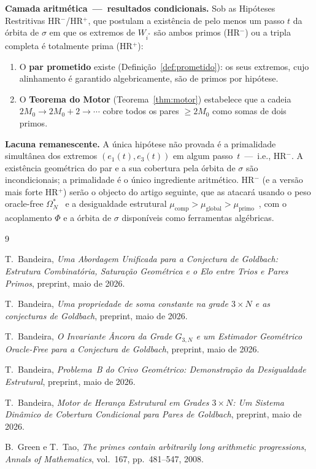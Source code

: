 \documentclass[12pt, a4paper]{article}
\theoremstyle{plain}
\theoremstyle{definition}
\theoremstyle{remark}
\begin{document}
	\medskip
	\noindent\textbf{Camada aritmética~---~resultados condicionais.}
	Sob as Hipóteses Restritivas HR$^-$/HR$^+$, que postulam a
	existência de pelo menos um passo $t$ da órbita de $\sigma$ em que
	os extremos de $W_{i^*}$ são ambos primos (HR$^-$) ou a tripla
	completa é totalmente prima (HR$^+$):
	\begin{enumerate}
		\item O \textbf{par prometido} existe
		(Definição~\ref{def:prometido}): os seus extremos, cujo
		alinhamento é garantido algebricamente, são de primos por
		hipótese.
		\item O \textbf{Teorema do Motor}
		(Teorema~\ref{thm:motor}) estabelece que a cadeia
		$2M_0\to2M_0+2\to\cdots$ cobre todos os pares $\geq 2M_0$
		como somas de dois primos.
	\end{enumerate}
	
	\medskip
	\noindent\textbf{Lacuna remanescente.}
	A única hipótese não provada é a primalidade simultânea dos
	extremos $(e_1(t),e_3(t))$ em algum passo~$t$~---~i.e., HR$^-$.
	A existência geométrica do par e a sua cobertura pela órbita de
	$\sigma$ são incondicionais; a primalidade é o único ingrediente
	aritmético.  HR$^-$ (e a versão mais forte HR$^+$) serão o objecto
	do artigo seguinte, que as atacará usando o peso oracle-free
	$\Omega_N^*$~\cite{peso} e a desigualdade estrutural
	$\mu_{\text{comp}}>\mu_{\text{global}}>\mu_{\text{primo}}$~\cite{problemaB},
	com o acoplamento $\Phi$ e a órbita de $\sigma$ disponíveis como
	ferramentas algébricas.
	
	\begin{thebibliography}{9}
		
		T.~Bandeira,
		\textit{Uma Abordagem Unificada para a Conjectura de Goldbach:
			Estrutura Combinatória, Saturação Geométrica e o Elo entre Trios
			e Pares Primos}, preprint, maio de 2026.
		
		T.~Bandeira,
		\textit{Uma propriedade de soma constante na grade $3\times N$
			e as conjecturas de Goldbach}, preprint, maio de 2026.
		
		T.~Bandeira,
		\textit{O Invariante Âncora da Grade $G_{3,N}$ e um Estimador
			Geométrico Oracle-Free para a Conjectura de Goldbach},
		preprint, maio de 2026.
		
		T.~Bandeira,
		\textit{Problema~B do Crivo Geométrico: Demonstração da
			Desigualdade Estrutural}, preprint, maio de 2026.
		
		T.~Bandeira,
		\textit{Motor de Herança Estrutural em Grades $3\times N$:
			Um Sistema Dinâmico de Cobertura Condicional para Pares de
			Goldbach}, preprint, maio de 2026.
		
		B.~Green e T.~Tao,
		\textit{The primes contain arbitrarily long arithmetic
			progressions},
		\textit{Annals of Mathematics}, vol.~167, pp.~481--547, 2008.
		
	\end{thebibliography}
	
\end{document}
